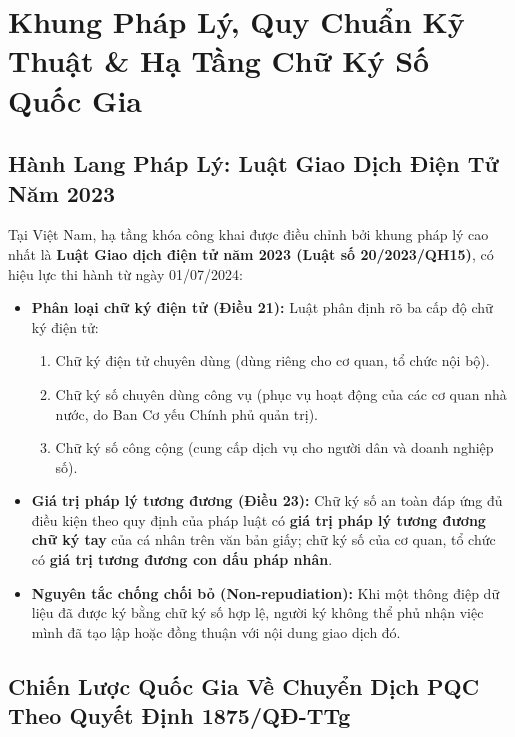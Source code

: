 \chapter{Khung Pháp Lý, Quy Chuẩn Kỹ Thuật \& Hạ Tầng Chữ Ký Số Quốc Gia}


\section{Hành Lang Pháp Lý: Luật Giao Dịch Điện Tử Năm 2023}

Tại Việt Nam, hạ tầng khóa công khai được điều chỉnh bởi khung pháp lý cao nhất là \textbf{Luật Giao dịch điện tử năm 2023 (Luật số 20/2023/QH15)}, có hiệu lực thi hành từ ngày 01/07/2024:
\begin{itemize}
  \item \textbf{Phân loại chữ ký điện tử (Điều 21):} Luật phân định rõ ba cấp độ chữ ký điện tử:
  \begin{enumerate}
    \item Chữ ký điện tử chuyên dùng (dùng riêng cho cơ quan, tổ chức nội bộ).
    \item Chữ ký số chuyên dùng công vụ (phục vụ hoạt động của các cơ quan nhà nước, do Ban Cơ yếu Chính phủ quản trị).
    \item Chữ ký số công cộng (cung cấp dịch vụ cho người dân và doanh nghiệp số).
  \end{enumerate}
  \item \textbf{Giá trị pháp lý tương đương (Điều 23):} Chữ ký số an toàn đáp ứng đủ điều kiện theo quy định của pháp luật có \textbf{giá trị pháp lý tương đương chữ ký tay} của cá nhân trên văn bản giấy; chữ ký số của cơ quan, tổ chức có \textbf{giá trị tương đương con dấu pháp nhân}.
  \item \textbf{Nguyên tắc chống chối bỏ (Non-repudiation):} Khi một thông điệp dữ liệu đã được ký bằng chữ ký số hợp lệ, người ký không thể phủ nhận việc mình đã tạo lập hoặc đồng thuận với nội dung giao dịch đó.
\end{itemize}

\section{Chiến Lược Quốc Gia Về Chuyển Dịch PQC Theo Quyết Định 1875/QĐ-TTg}

